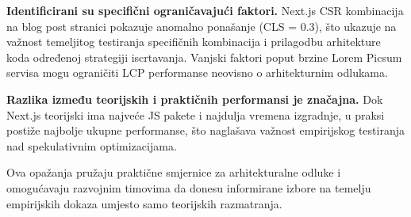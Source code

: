 \textbf{Identificirani su specifični ograničavajući faktori.} Next.js CSR kombinacija na blog post stranici pokazuje anomalno ponašanje (CLS = 0.3), što ukazuje na važnost temeljitog testiranja specifičnih kombinacija i prilagodbu arhitekture koda određenoj strategiji iscrtavanja. Vanjski faktori poput brzine Lorem Picsum servisa mogu ograničiti LCP performanse neovisno o arhitekturnim odlukama.

\textbf{Razlika između teorijskih i praktičnih performansi je značajna.} Dok Next.js teorijski ima najveće JS pakete i najdulja vremena izgradnje, u praksi postiže najbolje ukupne performanse, što naglašava važnost empirijskog testiranja nad spekulativnim optimizacijama.

Ova opažanja pružaju praktične smjernice za arhitekturalne odluke i omogućavaju razvojnim timovima da donesu informirane izbore na temelju empirijskih dokaza umjesto samo teorijskih razmatranja.
